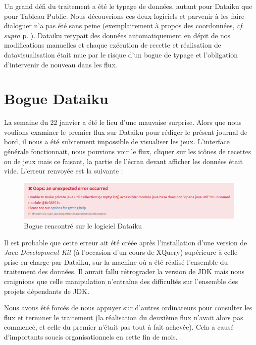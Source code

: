 \documentclass[hidelinks, 12pt]{report}
\begin{document}
Un grand défi du traitement a été le typage de données, autant pour Dataiku que pour Tableau Public. Nous découvrions ces deux logiciels et parvenir à les faire dialoguer n'a pas été sans peine (exemplairement à propos des coordonnées, \textit{cf}. \textit{supra} p. \pageref{casse}). Dataiku retypait des données automatiquement en dépit de nos modifications manuelles et chaque exécution de recette et réalisation de datavisualisation était mue par le risque d'un bogue de typage et l'obligation d'intervenir de nouveau dans les flux.

\section{Bogue Dataiku}

La semaine du 22 janvier a été le lieu d'une mauvaise surprise. Alors que nous voulions examiner le premier flux sur Dataiku pour rédiger le présent journal de bord, il nous a été subitement impossible de visualiser les jeux. L'interface générale fonctionnait, nous pouvions voir le flux, cliquer sur les icônes de recettes ou de jeux mais ce faisant, la partie de l'écran devant afficher les données était vide. L'erreur renvoyée est la suivante :

\begin{center}
	\begin{figure}[H]
		\centering
		\setlength{\belowcaptionskip}{-35pt}
		\includegraphics[scale=0.49]{images/bogue.png}
		\caption{Bogue rencontré sur le logiciel Dataiku}
	\end{figure}
\end{center}

Il est probable que cette erreur ait été créée après l'installation d'une version de \textit{Java Development Kit} (à l'occasion d'un cours de XQuery) supérieure à celle prise en charge par Dataiku, sur la machine où a été réalisé l'ensemble du traitement des données. Il aurait fallu rétrograder la version de JDK mais nous craignions que celle manipulation n'entraîne des difficultés sur l'ensemble des projets dépendants de JDK.

Nous avons été forcés de nous appuyer sur d'autres ordinateurs pour consulter les flux et terminer le traitement (la réalisation du deuxième flux n'avait alors pas commencé, et celle du premier n'était pas tout à fait achevée). Cela a causé d'importants soucis organisationnels en cette fin de mois.
\end{document}
